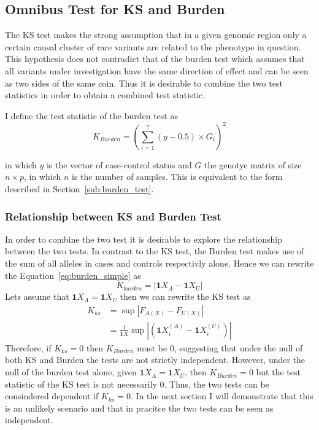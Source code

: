 \subsection{Omnibus Test for KS and Burden}
\label{sub:omnibus_test_for_ks_and_burden}

The KS test makes the strong assumption that in a given genomic region only a certain causal cluster of rare variants are related to the phenotype in question.
This hypothesis does not contradict that of the burden test which assumes that all variants under investigation have the same direction of effect and can be seen as two sides of the same coin.
Thus it is desirable to combine the two test statistics in order to obtain a combined test statistic.

I define the test statistic of the burden test as 
\begin{equation}\label{eq:burden_simple}
  K_{Burden} = {(\sum^\gamma_{i=1} (y-0.5) \times G_i)}^2
\end{equation}

in which $y$ is the vector of case-control status and $G$ the genotye matrix of size $n \times p$, in which $n$ is the number of samples.
This is equivalent to the form described in Section~\ref{sub:burden_test}.

\subsubsection{Relationship between KS and Burden Test}
\label{ssub:Relationship_between_KS_and_Burden_Test}

In order to combine the two test it is desirable to explore the relationship between the two tests.
In contrast to the KS test, the Burden test makes use of the sum of all alleles in cases and controls respectivly alone.
Hence we can rewrite the Equation~\ref{eq:burden_simple} as
\begin{equation}
  K_{burden} =  |\pmb{1}X_{A}  - \pmb{1}X_{U}|
\end{equation}
Lets assume that $\pmb{1}X_{A} = \pmb{1}X_{U}$ then we can rewrite the KS test as
\begin{equation}
  \begin{aligned}
    K_{ks} & = \sup |F_{A(X)} - F_{U(X)}|  \\
           & = \frac{1}{\pmb{1}X} \sup |(\pmb{1}X^{(A)}_i - \pmb{1}X^{(U)}_i)|
  \end{aligned}
\end{equation}
Therefore, if $K_{ks}=0$ then $K_{Burden}$ must be $0$, suggesting that under the null of both KS and Burden the tests are not strictly independent.
However, under the null of the burden test alone, given $\pmb{1}X_{A} = \pmb{1}X_{U}$, then $K_{Burden} = 0$ but the test statistic of the KS test is not necessarily $0$.
Thus, the two tests can be consindered dependent if $K_{ks} = 0$.
In the next section I will demonstrate that this is an unlikely scenario and that in pracitce the two tests can be seen as independent.

